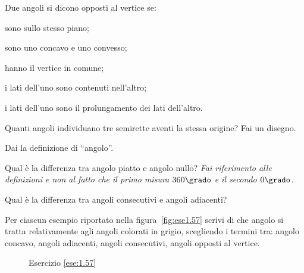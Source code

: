 \pagebreak

\begin{esercizio}
Due angoli si dicono opposti al vertice se:
\begin{enumeratea}
\item sono sullo stesso piano;
\item sono uno concavo e uno convesso;
\item hanno il vertice in comune;
\item i lati dell'uno sono contenuti nell'altro;
\item i lati dell'uno sono il prolungamento dei lati dell'altro.
\end{enumeratea}
\end{esercizio}

\begin{esercizio}
Quanti angoli individuano tre semirette aventi la stessa origine? Fai 
un disegno.
\end{esercizio}

\begin{esercizio}
Dai la definizione di ``angolo''.
\end{esercizio}

\begin{esercizio}
Qual è la differenza tra angolo piatto e angolo nullo? \emph{Fai 
riferimento alle definizioni e non al fatto che il primo misura 
\(360\grado\) e il secondo \(0\grado\).}
\end{esercizio}

\begin{esercizio}
Qual è la differenza tra angoli consecutivi e angoli adiacenti?
\end{esercizio}

\begin{esercizio}
Per ciascun esempio riportato nella figura~\ref{fig:ese1.57} scrivi 
di che angolo si tratta relativamente agli angoli colorati in grigio, 
scegliendo i termini tra: angolo concavo, angoli adiacenti, angoli 
consecutivi, angoli opposti al vertice.
\end{esercizio}


\begin{inaccessibleblock}
 \begin{figure}[htb]
 \centering
 \caption{Esercizio \ref{ese:1.57}}%
\end{figure}
\end{inaccessibleblock}

